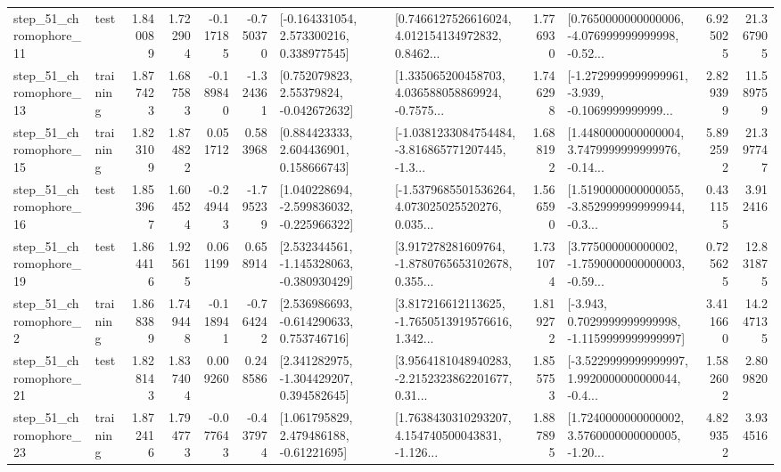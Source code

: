 \begin{tabular}{llrrrrllrlrr}
   step\_51\_chromophore\_11 &      test &      1.840089 &    1.722904 &     -0.117185 & -0.750370 &    [-0.164331054, 2.573300216, 0.338977545] &  [0.7466127526616024, 4.012154134972832, 0.8462... &       1.776930 &  [0.7650000000000006, -4.076999999999998, -0.52... &            6.925025 &         21.367905 \\
   step\_51\_chromophore\_13 &  training &      1.877423 &    1.687583 &     -0.189840 & -1.324361 &     [0.752079823, 2.55379824, -0.042672632] &  [1.335065200458703, 4.036588058869924, -0.7575... &       1.746298 &  [-1.2729999999999961, -3.939, -0.1069999999999... &            2.829399 &         11.589759 \\
   step\_51\_chromophore\_15 &  training &      1.823109 &    1.874822 &      0.051712 &  0.583968 &     [0.884423333, 2.604436901, 0.158666743] &  [-1.0381233084754484, -3.816865771207445, -1.3... &       1.688192 &  [1.4480000000000004, 3.7479999999999976, -0.14... &            5.892592 &         21.397747 \\
   step\_51\_chromophore\_16 &      test &      1.853967 &    1.604524 &     -0.249443 & -1.795239 &   [1.040228694, -2.599836032, -0.225966322] &  [-1.5379685501536264, 4.073025025520276, 0.035... &       1.566590 &  [1.5190000000000055, -3.8529999999999944, -0.3... &            0.431155 &          3.912416 \\
   step\_51\_chromophore\_19 &      test &      1.864416 &    1.925615 &      0.061199 &  0.658914 &   [2.532344561, -1.145328063, -0.380930429] &  [3.917278281609764, -1.8780765653102678, 0.355... &       1.731074 &  [3.775000000000002, -1.7590000000000003, -0.59... &            0.725625 &         12.831875 \\
    step\_51\_chromophore\_2 &  training &      1.868389 &    1.749448 &     -0.118941 & -0.764242 &    [2.536986693, -0.614290633, 0.753746716] &  [3.817216612113625, -1.7650513919576616, 1.342... &       1.819272 &  [-3.943, 0.7029999999999998, -1.1159999999999997] &            3.411660 &         14.247135 \\
   step\_51\_chromophore\_21 &      test &      1.828143 &    1.837404 &      0.009260 &  0.248586 &    [2.341282975, -1.304429207, 0.394582645] &  [3.9564181048940283, -2.2152323862201677, 0.31... &       1.855753 &  [-3.5229999999999997, 1.9920000000000044, -0.4... &            1.582602 &          2.809820 \\
   step\_51\_chromophore\_23 &  training &      1.872416 &    1.794773 &     -0.077643 & -0.437974 &     [1.061795829, 2.479486188, -0.61221695] &  [1.7638430310293207, 4.154740500043831, -1.126... &       1.887895 &  [1.7240000000000002, 3.5760000000000005, -1.20... &            4.829352 &          3.934516 \\

\end{tabular}
